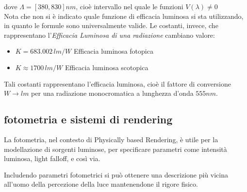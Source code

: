 dove $\Lambda = [380, 830] \si{nm}$, cio\`e intervallo nel quale le funzioni $V(\lambda) \neq 0$\\
Nota che non si \`e indicato quale funzione di efficacia luminosa si sta utilizzando, in quanto le formule sono universalmente valide. Le costanti,
invece, che rappresentano l'\textit{Efficacia Luminosa di una radiazione} cambiano valore:
\begin{itemize}[topsep=0pt, noitemsep]
	\item[] $K = 683.002\,\si{lm/W}$ Efficacia luminosa fotopica 
	\item[] $K \approx 1700\,\si{lm/W}$ Efficacia luminosa scotopica
\end{itemize}
Tali costanti rappresentano l'efficacia luminosa, cio\`e il fattore di conversione \mbox{$\si{W}\rightarrow\si{lm}$} per una radiazione monocromatica a
lunghezza d'onda $555 \si{nm}$.\par
\subsection{fotometria e sistemi di rendering}
La fotometria, nel contesto di Physically based Rendering, \`e utile per la modellazione di sorgenti luminose, per specificare parametri come 
intensit\`a luminosa, light falloff, e cos\`i via.\par
Includendo parametri fotometrici si pu\`o ottenere una descrizione pi\`u vicina all'uomo della percezione della luce mantenendone il rigore fisico.
